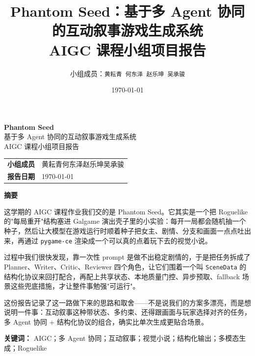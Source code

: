 \documentclass[12pt,a4paper]{article}
\title{\vspace{-1.2cm}
    \textbf{Phantom Seed：基于多 Agent 协同的互动叙事游戏生成系统}\\[0.3em]
    \large AIGC 课程小组项目报告
}
\author{小组成员：\texttt{黄耘青 何东泽 赵乐坤 吴承骏}}
\date{\today}
\begin{document}
\begin{titlepage}
    \thispagestyle{empty}
    \vspace*{\fill}
    \begin{center}
        {\Huge\bfseries Phantom Seed}\\[0.8em]
        {\Large 基于多 Agent 协同的互动叙事游戏生成系统}\\[2.5em]
        {\large AIGC 课程小组项目报告}\\[6em]

        \begin{tabular}{rl}
            \textbf{小组成员}\quad & 黄耘青\quad 何东泽\quad 赵乐坤\quad 吴承骏 \\[0.6em]
            \textbf{报告日期}\quad & \today \\
        \end{tabular}
    \end{center}
    \vspace*{\fill}
\end{titlepage}

\thispagestyle{empty}
\begin{center}
    {\LARGE\bfseries 摘\quad 要}
\end{center}
\vspace{1em}

这学期的 AIGC 课程作业我们交的是 Phantom Seed。它其实是一个把 Roguelike 的"每局重开"结构塞进 Galgame 演出壳子里的小实验：每开一局都会随机抽一个种子，然后让大模型在游戏运行时顺着种子把女主、剧情、分支和画面一点点吐出来，再通过 \texttt{pygame-ce} 渲染成一个可以真的点着玩下去的视觉小说。

过程中我们很快发现，靠一次性 prompt 是做不出稳定剧情的，于是把任务拆成了 Planner、Writer、Critic、Reviewer 四个角色，让它们围着一个叫 \texttt{SceneData} 的结构化协议来回打配合，再配上共享状态、本地质量门控、异步预取、fallback 场景这些兜底措施，才让整件事勉强"可运行"。

这份报告记录了这一路做下来的思路和取舍——不是说我们的方案多漂亮，而是想说明一件事：互动叙事这种带状态、多约束、还得跟画面与玩家选择对齐的任务，多 Agent 协同 + 结构化协议的组合，确实比单次生成更贴合场景。

\vspace{2em}
\noindent\textbf{关键词：} AIGC；多 Agent 协同；互动叙事；视觉小说；结构化输出；多模态生成；Roguelike

\newpage

\thispagestyle{empty}
\tableofcontents
\newpage
\end{document}
